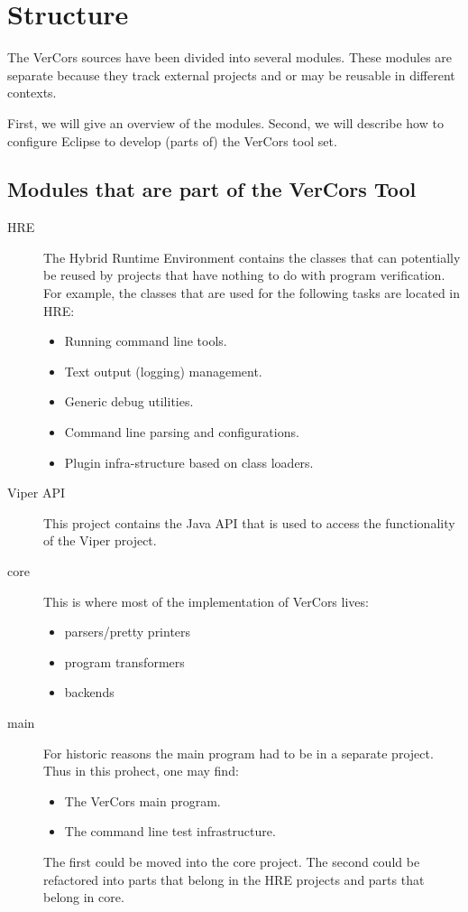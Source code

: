 \chapter{Structure}

The VerCors sources have been divided into several modules.
These modules are separate because they track external
projects and or may be reusable in different contexts.

First, we will give an overview of the modules.
Second, we will describe how to configure Eclipse to develop
(parts of) the VerCors tool set.

\section{Modules that are part of the VerCors Tool}

\begin{description}
\item[HRE] The Hybrid Runtime Environment contains the classes that can potentially be
reused by projects that have nothing to do with program verification. For example,
the classes that are used for the following tasks are located in HRE:
\begin{itemize}
\item Running command line tools.
\item Text output (logging) management.
\item Generic debug utilities.
\item Command line parsing and configurations.
\item Plugin infra-structure based on class loaders.
\end{itemize}
\item[Viper API]
This project contains the Java API that is used to access the functionality of the Viper project.
\item[core] This is where most of the implementation of VerCors lives:
\begin{itemize}
\item parsers/pretty printers
\item program transformers
\item backends
\end{itemize}
\item[main] For historic reasons the main program had to be in a separate project.
Thus in this prohect, one may find:
\begin{itemize}
\item The VerCors main program.
\item The command line test infrastructure.
\end{itemize}
The first could be moved into the core project. The second could be refactored into
parts that belong in the HRE projects and parts that belong in core.
\end{description}

